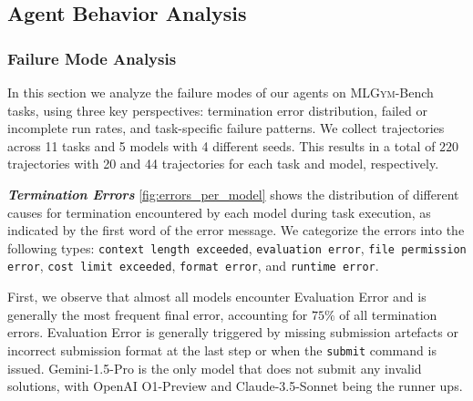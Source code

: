 \documentclass[]{fairmeta}
\newcommand{\ibold}[1]{\textbf{\textit{#1}}}
\newcommand{\mlgym}{\fontfamily{lmr}\selectfont\mdseries\textsc{MLGym}\xspace}
\begin{document}
\subsection{Agent Behavior Analysis}
\label{sec:agent_behavior_analysis}

\subsubsection{Failure Mode Analysis}
\label{sec:failure_analysis}



In this section we analyze the failure modes of our agents on \mlgym-Bench tasks, using three key perspectives: termination error distribution, failed or incomplete run rates, and task-specific failure patterns.
%
%
We collect trajectories across 11 tasks and 5 models with 4 different seeds. 
%
This results in a total of $220$ trajectories with 20 and 44 trajectories for each task and model, respectively.

\ibold{Termination Errors}
\autoref{fig:errors_per_model} shows the distribution of different causes for termination encountered by each model during task execution, as indicated by the first word of the error message.
%
We categorize the errors into the following types: \texttt{context length exceeded}, \texttt{evaluation error}, \texttt{file permission error}, \texttt{cost limit exceeded}, \texttt{format error}, and \texttt{runtime error}.

First, we observe that almost all models encounter Evaluation Error and is generally the most frequent final error, accounting for $75\%$ of all termination errors.
%
Evaluation Error is generally triggered by missing submission artefacts or incorrect submission format at the last step or when the \texttt{submit} command is issued. 
%
Gemini-1.5-Pro is the only model that does not submit any invalid solutions, with OpenAI O1-Preview and Claude-3.5-Sonnet being the runner ups.
\end{document}
